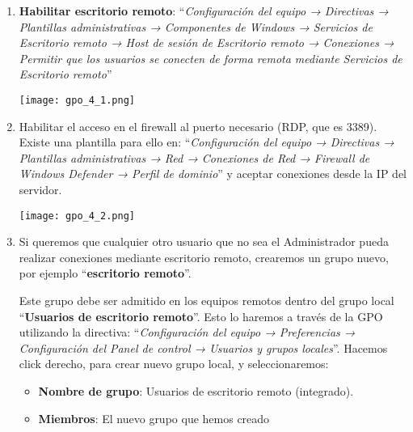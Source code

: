 \begin{enumerate}
    \item \textbf{Habilitar escritorio remoto}: “\textit{Configuración del equipo  →  Directivas  →  Plantillas administrativas \hfill →   Componentes de Windows → Servicios de Escritorio remoto → Host de sesión de Escritorio remoto → Conexiones → Permitir que los usuarios se conecten de forma remota mediante Servicios de Escritorio remoto}”

    \begin{center}
        \texttt{[image: gpo\_4\_1.png]}
    \end{center}

    \item Habilitar el acceso en el firewall al puerto necesario (RDP, que es 3389). Existe una plantilla para ello en: “\textit{Configuración del equipo → Directivas → Plantillas administrativas → Red → Conexiones de Red → Firewall de Windows Defender → Perfil de dominio}” y aceptar conexiones desde la IP del servidor.

    \begin{center}
        \texttt{[image: gpo\_4\_2.png]}
    \end{center}


    \item Si queremos que cualquier otro usuario que no sea el Administrador pueda realizar conexiones mediante escritorio remoto, crearemos un grupo nuevo, por ejemplo “\textbf{escritorio remoto}”.

    Este grupo debe ser admitido en los equipos remotos dentro del grupo local “\textbf{Usuarios de escritorio remoto}”. Esto lo haremos a través de la GPO utilizando la directiva: “\textit{Configuración del equipo → Preferencias → Configuración del Panel de control → Usuarios y grupos locales}”. Hacemos click derecho, para crear nuevo grupo local, y seleccionaremos:
    \begin{itemize}
        \item \textbf{Nombre de grupo}: Usuarios de escritorio remoto (integrado).
        \item \textbf{Miembros}: El nuevo grupo que hemos creado
    \end{itemize}
\end{enumerate}

